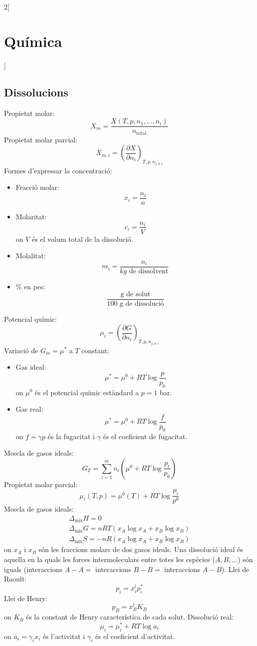 \documentclass[../../../main.tex]{subfiles}
\begin{document}
\begin{multicols}{2}[\section{Química}]
\subsection{Dissolucions}
Propietat molar: $$X_m=\frac{X(T,p,n_1,\ldots,n_i)}{n_\text{total}}$$
Propietat molar parcial: $$X_{m,i}=\left(\frac{\partial X}{\partial n_i}\right)_{T,p,n_{j\ne i}}$$
Formes d'expressar la concentració:
\begin{itemize}
    \item Fracció molar: $$x_i=\frac{n_i}{n}$$
    \item Molaritat: $$c_i=\frac{n_i}{V}$$ {\footnotesize on $V$ és el volum total de la dissolució.}
    \item Molalitat: $$m_i=\frac{n_i}{kg\text{ de dissolvent}}$$ 
    \item \% en pes: $$\frac{\text{g de solut}}{\text{100 g de dissolució}}$$
\end{itemize}
Potencial químic: $$\mu_i=\left(\frac{\partial G}{\partial n_i}\right)_{T,p,n_{j\ne i}}$$
Variació de $G_m=\mu^*$ a $T$ constant:
\begin{itemize}
    \item Gas ideal: $$\mu^*=\mu^0+RT\log\frac{p}{p_0}$$ {\footnotesize on $\mu^0$ és el potencial químic estàndard a $p=1$ bar.}
    \item Gas real: $$\mu^*=\mu^0+RT\log\frac{f}{p_0}$$ {\footnotesize on $f=\gamma p$ és la fugacitat i $\gamma$ és el coeficient de fugacitat.}
\end{itemize}
Mescla de gasos ideals: $$G_T=\sum_{i=1}^mn_i\left(\mu^0+RT\log\frac{p_i}{p_0}\right)$$
Propietat molar parcial: $$\mu_i(T,p)=\mu^0(T)+RT\log\frac{p_i}{p^0}$$
Mescla de gasos ideals: 
\begin{gather*}
    \Delta_\text{mix}H=0\\
    \Delta_\text{mix}G=nRT(x_A\log x_A+x_B\log x_B)\\
    \Delta_\text{mix}S=-nR(x_A\log x_A+x_B\log x_B)
\end{gather*} {\footnotesize on $x_A$ i $x_B$ són les fraccions molars de dos gasos ideals.}\newline
Una dissolució ideal és aquella en la quals les forces intermoleculars entre totes les espècies ($A, B,\ldots$) són iguals (interaccions $A-A=$ interaccions $B-B=$ interaccions $A-B$).\newline
Llei de Raoult: $$p_i=x_i^lp_i^*$$
Llei de Henry: $$p_B=x_B^lK_B$$ {\footnotesize on $K_B$ és la constant de Henry característica de cada solut.}\newline
Dissolució real: $$\mu_i=\mu_i^*+RT\log a_i$$ {\footnotesize on $a_i=\gamma_ix_i$ és l'activitat i $\gamma_i$ és el coeficient d'activitat.}

\end{multicols}
\end{document}
